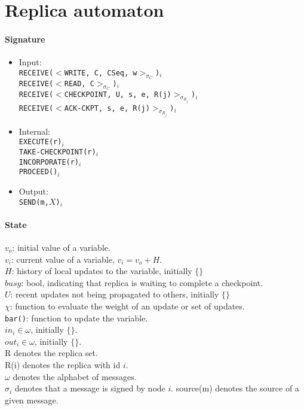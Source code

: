 \documentclass[letterpaper,twocolumn,10pt]{article}
\begin{document}
\section{Replica automaton}

\paragraph{Signature}
\begin{itemize}
\item{Input:}\\
\texttt{RECEIVE($<$WRITE, C, CSeq, w$>_{\sigma_{C}}$)$_{i}$}\\
\texttt{RECEIVE($<$READ, C$>_{\sigma_{C}}$)$_{i}$}\\
\texttt{RECEIVE($<$CHECKPOINT, U, s, e, R(j)$>_{\sigma_{R_{j}}}$)$_{i}$}\\
\texttt{RECEIVE($<$ACK-CKPT, s, e, R(j)$>_{\sigma_{R_{j}}}$)$_{i}$}

\item{Internal:}\\
\texttt{EXECUTE(r)$_{i}$}\\
\texttt{TAKE-CHECKPOINT(r)$_{i}$}\\
\texttt{INCORPORATE(r)$_{i}$}\\
\texttt{PROCEED()$_{i}$}

\item{Output:}\\
\texttt{SEND(m,$X$)$_{i}$}
\end{itemize}


\paragraph{State}
$v_{o}$: initial value of a variable.\\
$v_{i}$: current value of a variable, $v_{i} = v_{o} + H$.\\
$H$: history of local updates to the variable, initially $\{\}$\\
$busy$: bool, indicating that replica is waiting to complete a checkpoint.\\ 
$U$: recent updates not being propagated to others, initially $\{\}$\\
$\chi$: function to evaluate the weight of an update or set of updates.\\
\texttt{bar()}: function to update the variable.\\
$in_{i} \in \omega$, initially $\{\}$.\\
$out_{i} \in \omega$, initially $\{\}$.\\
R denotes the replica set.\\
R(i) denotes the replica with id $i$.\\
$\omega$ denotes the alphabet of messages.\\
$\sigma_{i}$ denotes that a message is signed by node $i$.
source(m) denotes the source of a given message.
\end{document}
